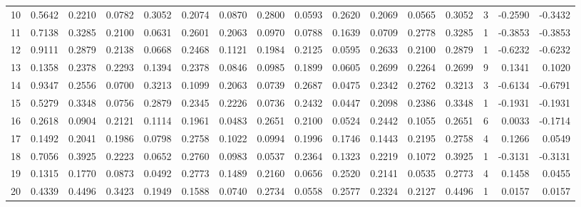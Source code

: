\begin{tabular}{lrrrrrrrrrrrrrrr}
10  &      0.5642 &  0.2210 &  0.0782 &  0.3052 &  0.2074 &  0.0870 &  0.2800 &  0.0593 &  0.2620 &  0.2069 &   0.0565 &     0.3052 &      3 &                   -0.2590 &                    -0.3432 \\
11  &      0.7138 &  0.3285 &  0.2100 &  0.0631 &  0.2601 &  0.2063 &  0.0970 &  0.0788 &  0.1639 &  0.0709 &   0.2778 &     0.3285 &      1 &                   -0.3853 &                    -0.3853 \\
12  &      0.9111 &  0.2879 &  0.2138 &  0.0668 &  0.2468 &  0.1121 &  0.1984 &  0.2125 &  0.0595 &  0.2633 &   0.2100 &     0.2879 &      1 &                   -0.6232 &                    -0.6232 \\
13  &      0.1358 &  0.2378 &  0.2293 &  0.1394 &  0.2378 &  0.0846 &  0.0985 &  0.1899 &  0.0605 &  0.2699 &   0.2264 &     0.2699 &      9 &                    0.1341 &                     0.1020 \\
14  &      0.9347 &  0.2556 &  0.0700 &  0.3213 &  0.1099 &  0.2063 &  0.0739 &  0.2687 &  0.0475 &  0.2342 &   0.2762 &     0.3213 &      3 &                   -0.6134 &                    -0.6791 \\
15  &      0.5279 &  0.3348 &  0.0756 &  0.2879 &  0.2345 &  0.2226 &  0.0736 &  0.2432 &  0.0447 &  0.2098 &   0.2386 &     0.3348 &      1 &                   -0.1931 &                    -0.1931 \\
16  &      0.2618 &  0.0904 &  0.2121 &  0.1114 &  0.1961 &  0.0483 &  0.2651 &  0.2100 &  0.0524 &  0.2442 &   0.1055 &     0.2651 &      6 &                    0.0033 &                    -0.1714 \\
17  &      0.1492 &  0.2041 &  0.1986 &  0.0798 &  0.2758 &  0.1022 &  0.0994 &  0.1996 &  0.1746 &  0.1443 &   0.2195 &     0.2758 &      4 &                    0.1266 &                     0.0549 \\
18  &      0.7056 &  0.3925 &  0.2223 &  0.0652 &  0.2760 &  0.0983 &  0.0537 &  0.2364 &  0.1323 &  0.2219 &   0.1072 &     0.3925 &      1 &                   -0.3131 &                    -0.3131 \\
19  &      0.1315 &  0.1770 &  0.0873 &  0.0492 &  0.2773 &  0.1489 &  0.2160 &  0.0656 &  0.2520 &  0.2141 &   0.0535 &     0.2773 &      4 &                    0.1458 &                     0.0455 \\
20  &      0.4339 &  0.4496 &  0.3423 &  0.1949 &  0.1588 &  0.0740 &  0.2734 &  0.0558 &  0.2577 &  0.2324 &   0.2127 &     0.4496 &      1 &                    0.0157 &                     0.0157 \\

\end{tabular}
